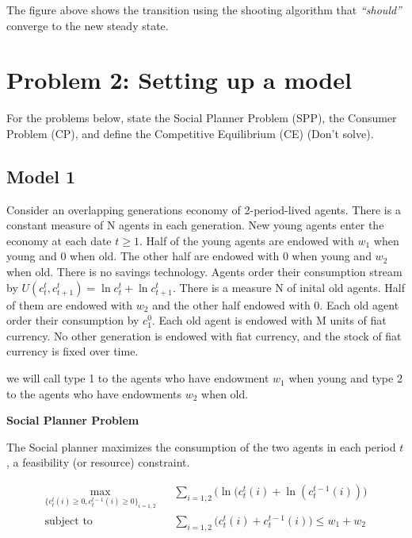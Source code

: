 \documentclass[10pt,notitlepage,onecolumn,aps,pra]{revtex4-1}
\begin{document}
    The figure above shows the transition using the shooting algorithm that
\emph{``should''} converge to the new steady state.

    \hypertarget{problem-2-setting-up-a-model}{%
\section{Problem 2: Setting up a
model}\label{problem-2-setting-up-a-model}}

For the problems below, state the Social Planner Problem (SPP), the
Consumer Problem (CP), and define the Competitive Equilibrium (CE)
(Don't solve).

    \hypertarget{model-1}{%
\subsection{Model 1}\label{model-1}}

Consider an overlapping generations economy of 2-period-lived agents.
There is a constant measure of \(\mathrm{N}\) agents in each generation.
New young agents enter the economy at each date \(t \geq 1 .\) Half of
the young agents are endowed with \(w_{1}\) when young and 0 when old.
The other half are endowed with 0 when young and \(w_{2}\) when old.
There is no savings technology. Agents order their consumption stream by
\(U\left(c_{t}^{t}, c_{t+1}^{t}\right)=\ln c_{t}^{t}+\ln c_{t+1}^{t} .\)
There is a measure \(\mathrm{N}\) of inital old agents. Half of them are
endowed with \(w_{2}\) and the other half endowed with \(0 .\) Each old
agent order their consumption by \(c_{1}^{0} .\) Each old agent is
endowed with \(\mathrm{M}\) units of fiat currency. No other generation
is endowed with fiat currency, and the stock of fiat currency is fixed
over time.

we will call type 1 to the agents who have endowment \(w_1\) when young
and type 2 to the agents who have endowments \(w_2\) when old.

    \textbf{Social Planner Problem}

The Social planner maximizes the consumption of the two agents in each
period \(t\), a feasibility (or resource) constraint.

\begin{equation*}
\begin{aligned}
\underset{\{c_t^t(i) \geq 0, c_t^{t-1}(i) \geq 0 \}_{i=1,2}}{\max} 
& &     \sum_{i=1,2} \Big(\ln(c_t^t(i)+\ln(c_t^{t-1}(i)) \Big)\\
\text{subject to}
& &  \sum_{i=1,2} \Big(c_t^t(i)+ c_t^{t-1}(i) \Big)\leq w_1+ w_2\\
\end{aligned}
\end{equation*}
\end{document}
